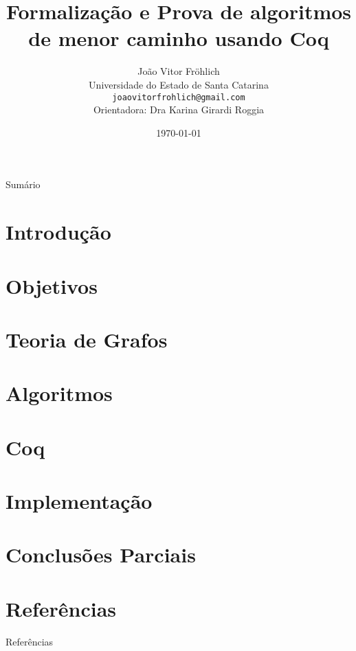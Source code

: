 \documentclass[xcolor=table]{beamer}
\title[]{Formalização e Prova de algoritmos de menor caminho usando Coq}
\author[João Vitor Fröhlich]{
    João Vitor Fröhlich\\\smallskip
    {\scriptsize Universidade do Estado de Santa Catarina \\\smallskip
    \vspace{-2mm}
    \texttt{joaovitorfrohlich@gmail.com}\\\medskip
    {Orientadora: Dra Karina Girardi Roggia}\\
    }
}
\date{\today}
\begin{document}
    \begin{frame}
        \titlepage
    \end{frame}

    \begin{frame}[allowframebreaks]{Sumário}
        \tableofcontents
    \end{frame}

    \section[]{Introdução}
    
    
    

    \section[]{Objetivos}
    
    


    \section[]{Teoria de Grafos}
    

    \section[]{Algoritmos}
    

    \section[]{Coq}
    

    \section[]{Implementação}
    

    \section[]{Conclusões Parciais}
    
    
    

    \section[]{Referências}
    \begin{frame}[allowframebreaks]{Referências}
        
    \end{frame}
\end{document}
